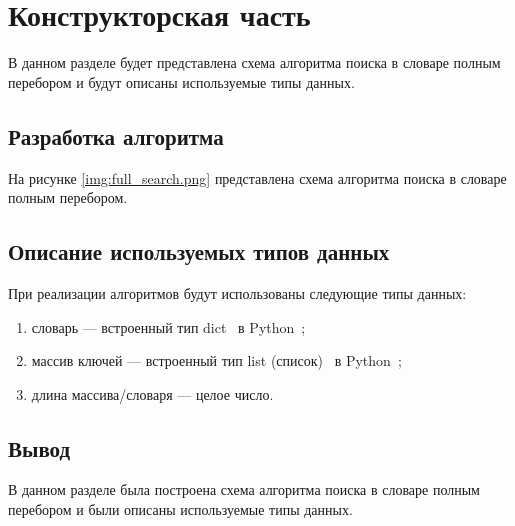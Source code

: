\chapter{Конструкторская часть}
В данном разделе будет представлена схема алгоритма поиска в словаре полным перебором и будут описаны используемые типы данных.


\section{Разработка алгоритма}
На рисунке \ref{img:full_search.png} представлена схема алгоритма поиска в словаре полным перебором.

\clearpage

\section{Описание используемых типов данных}
При реализации алгоритмов будут использованы следующие типы данных:
\begin{enumerate}[label=\arabic*)]
	\item словарь --- встроенный тип dict~\cite{pythondict} в Python~\cite{PythonBook};
	\item массив ключей --- встроенный тип list (список)~\cite{pythonlist} в Python~\cite{PythonBook};
	\item длина массива/словаря --- целое число.
\end{enumerate}


\section*{Вывод}
В данном разделе была построена схема алгоритма поиска в словаре полным перебором и были описаны используемые типы данных.
